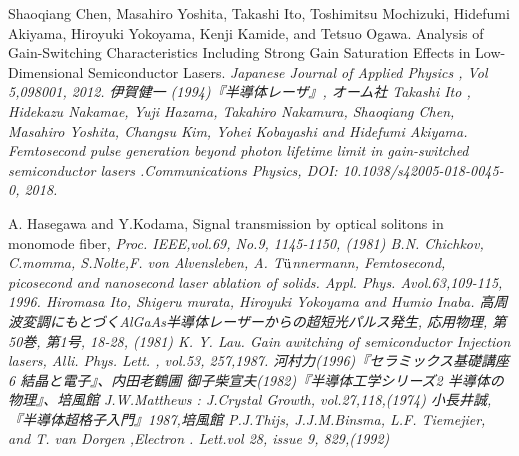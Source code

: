 \begin{thebibliography}{99}
 Shaoqiang Chen, Masahiro Yoshita, Takashi Ito, Toshimitsu Mochizuki, Hidefumi Akiyama, Hiroyuki Yokoyama, Kenji Kamide, and Tetsuo Ogawa. Analysis of Gain-Switching Characteristics Including Strong Gain Saturation Effects in Low-Dimensional Semiconductor Lasers. \sl Japanese Journal of Applied  Physics \rm , Vol 5,098001, 2012.
 伊賀健一 (1994)『半導体レーザ』, オーム社
Takashi Ito
, Hidekazu Nakamae, Yuji Hazama, Takahiro Nakamura, Shaoqiang Chen, Masahiro Yoshita, Changsu Kim, Yohei Kobayashi and Hidefumi Akiyama.
Femtosecond pulse generation beyond photon lifetime limit in gain-switched semiconductor lasers .\sl Communications Physics\rm , DOI: 10.1038/s42005-018-0045-0, 2018. 

 A. Hasegawa and Y.Kodama, Signal transmission by optical solitons in monomode fiber, \sl Proc. IEEE\rm ,vol.69, No.9, 1145-1150, (1981)
 B.N. Chichkov, C.momma, S.Nolte,F. von Alvensleben, A. T$\rm{\ddot{u}}$nnermann, Femtosecond, picosecond and nanosecond laser ablation of solids. \sl Appl. Phys. A\rm vol.63,109-115, 1996.
 Hiromasa Ito, Shigeru 
murata, Hiroyuki Yokoyama and Humio Inaba. 高周波変調にもとづくAlGaAs半導体レーザーからの超短光パルス発生, 応用物理, 第50巻, 第1号, 18-28, (1981)
 K. Y. Lau. Gain awitching of semiconductor Injection lasers, \sl Alli. Phys. Lett. \rm , vol.53, 257,1987.
河村力(1996)『セラミックス基礎講座6 結晶と電子』、内田老鶴圃
御子柴宣夫(1982)『半導体工学シリーズ2 半導体の物理』、培風館
 J.W.Matthews : J.Crystal Growth, vol.27,118,(1974)
小長井誠,『半導体超格子入門』1987,培風館
 P.J.Thijs, J.J.M.Binsma, L.F. Tiemejier, and T. van Dorgen ,\sl Electron . Lett.\rm vol 28, issue 9, 829,(1992)
\end{thebibliography}
